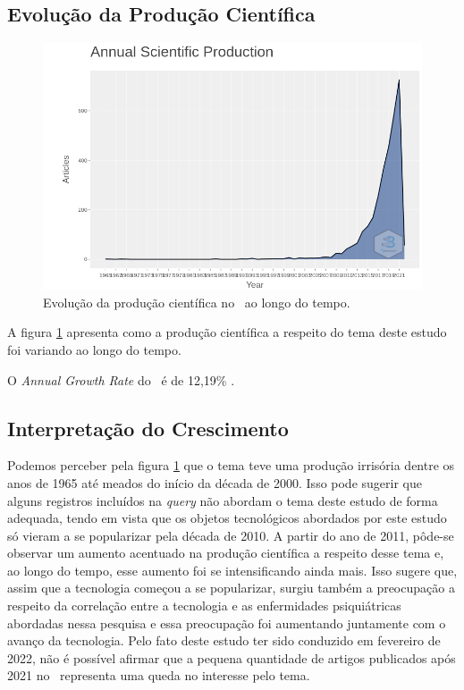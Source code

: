 \subsection{Evolução da Produção Científica}

\begin{figure}
    \centering
    \includegraphics[width=1\textwidth]{experiments/GustavoMacCar/AnaliseBibliometrica/PsychDiseasesTech/anual-scientific-production.png}
    \caption{Evolução da produção científica no \dataset\ ao longo do tempo.}
    \label{fig:evol:anual:psych}
\end{figure}

A figura \ref{fig:evol:anual:psych} apresenta como a produção científica a respeito do tema deste estudo foi variando ao longo do tempo.

O \textit{Annual Growth Rate} do \dataset\   é de 12,19\% .

\subsection{Interpretação do Crescimento} Podemos perceber pela figura \ref{fig:evol:anual:psych} que o tema teve uma produção irrisória dentre os anos de 1965 até meados do início da década de 2000. Isso pode sugerir
que alguns registros incluídos na \textit{query} não abordam o tema deste estudo de forma adequada, tendo em vista que os objetos tecnológicos abordados por este estudo só vieram a se popularizar pela década de 2010. A partir do
ano de 2011, pôde-se observar um aumento acentuado na produção científica a respeito desse tema e, ao longo do tempo, esse aumento foi se intensificando ainda mais. Isso sugere que, assim que a tecnologia começou a se popularizar, surgiu também
a preocupação a respeito da correlação entre a tecnologia e as enfermidades psiquiátricas abordadas nessa pesquisa e essa preocupação foi aumentando juntamente com o avanço da tecnologia. Pelo fato deste estudo ter sido conduzido em fevereiro de 2022,
não é possível afirmar que a pequena quantidade de artigos publicados após 2021 no \dataset\ representa uma queda no interesse pelo tema.
